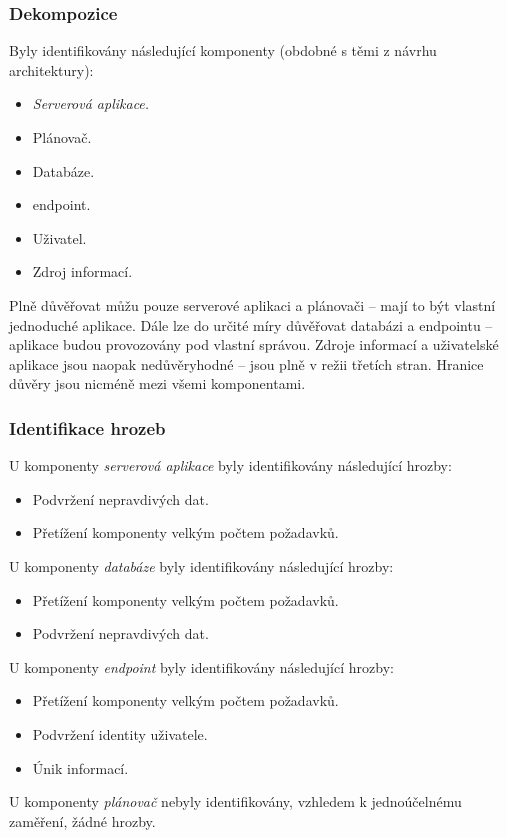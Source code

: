 \subsubsection{Dekompozice}
Byly identifikovány následující komponenty (obdobné s těmi z návrhu architektury):
\begin{itemize}
 \item \textit{Serverová aplikace.}
 \item Plánovač.
 \item Databáze.
 \item {} endpoint.
 \item Uživatel.
 \item Zdroj informací.
\end{itemize}
Plně důvěřovat můžu pouze serverové aplikaci a plánovači -- mají to být vlastní jednoduché aplikace. Dále lze do určité míry důvěřovat databázi a  endpointu -- aplikace budou provozovány pod vlastní správou. Zdroje informací a uživatelské aplikace jsou naopak nedůvěryhodné -- jsou plně v režii třetích stran. Hranice důvěry jsou nicméně mezi všemi komponentami.

\subsubsection{Identifikace hrozeb}
U komponenty \emph{serverová aplikace} byly identifikovány následující hrozby:
\begin{itemize}
 \item Podvržení nepravdivých dat.
 \item Přetížení komponenty velkým počtem požadavků.
\end{itemize}
U komponenty \emph{databáze} byly identifikovány následující hrozby:
\begin{itemize}
 \item Přetížení komponenty velkým počtem požadavků.
 \item Podvržení nepravdivých dat.
\end{itemize}
U komponenty \emph{ endpoint} byly identifikovány následující hrozby:
\begin{itemize}
 \item Přetížení komponenty velkým počtem požadavků.
 \item Podvržení identity uživatele.
 \item Únik informací.
\end{itemize}
U komponenty \emph{plánovač} nebyly identifikovány, vzhledem k jednoúčelnému zaměření, žádné hrozby.

